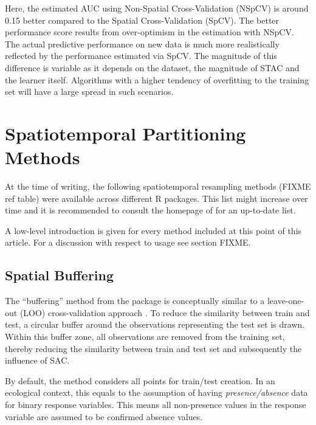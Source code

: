 \documentclass[
]{jss}
\begin{document}
Here, the estimated AUC using Non-Spatial Cross-Validation (NSpCV) is
around 0.15 better compared to the Spatial Cross-Validation (SpCV). The
better performance score results from over-optimism in the estimation
with NSpCV. The actual predictive performance on new data is much more
realistically reflected by the performance estimated via SpCV. The
magnitude of this difference is variable as it depends on the dataset,
the magnitude of STAC and the learner itself. Algorithms with a higher
tendency of overfitting to the training set will have a large spread in
such scenarios.

\hypertarget{spatiotemporal-partitioning-methods}{%
\section{Spatiotemporal Partitioning
Methods}\label{spatiotemporal-partitioning-methods}}

At the time of writing, the following spatiotemporal resampling methods
(FIXME ref table) were available across different R packages. This list
might increase over time and it is recommended to consult the homepage
of  for an up-to-date list.

A low-level introduction is given for every method included at this
point of this article. For a discussion with respect to usage see
section FIXME.

\hypertarget{spatial-buffering}{%
\subsection{Spatial Buffering}\label{spatial-buffering}}

The ``buffering'' method from the  package is conceptually
similar to a leave-one-out (LOO) cross-validation approach
\citep[\citet{blockCV}]{rest2014}. To reduce the similarity between
train and test, a circular buffer around the observations representing
the test set is drawn. Within this buffer zone, all observations are
removed from the training set, thereby reducing the similarity between
train and test set and subsequently the influence of SAC.

By default, the method considers all points for train/test creation. In
an ecological context, this equals to the assumption of having
\emph{presence/absence} data for binary response variables. This means
all non-presence values in the response variable are assumed to be
confirmed absence values.
\end{document}
